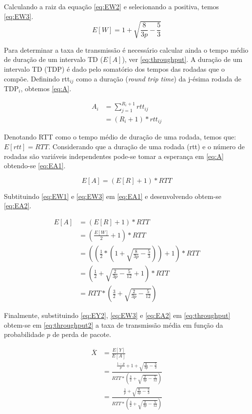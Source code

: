 Calculando a raiz da equação \eqref{eq:EW2} e selecionando a positiva, temos \eqref{eq:EW3}.
\begin{equation} \label{eq:EW3}
E[W] = 1 + \sqrt{\frac{8}{3p} - \frac{5}{3}}
\end{equation}

Para determinar a taxa de transmissão é necessário calcular ainda o tempo médio de duração de um intervalo 
TD ($E[A]$), ver \eqref{eq:throughput}. A duração de um intervalo TD (TDP) é dado pelo somatório dos tempos
das rodadas que o compõe. Definindo rtt$_{ij}$ como a duração (\textit{round trip time}) da j-ésima rodada
de TDP$_i$, obtemos \eqref{eq:A}.

\begin{align} \label{eq:A}
\nonumber A_i &= \sum_{j=1}^{R_i + 1} rtt_{ij} \\
&=(R_i + 1) * rtt_{ij}
\end{align}

Denotando RTT como o tempo médio de duração de uma rodada, temos que: $E[rtt]=RTT$. Considerando que a duração
de uma rodada (rtt) e o número de rodadas são variáveis independentes pode-se tomar a esperança em \eqref{eq:A}
obtendo-se \eqref{eq:EA1}.

\begin{equation} \label{eq:EA1}
E[A] = (E[R] + 1) * RTT
\end{equation}

Subtituindo \eqref{eq:EW1} e \eqref{eq:EW3} em \eqref{eq:EA1} e desenvolvendo obtem-se \eqref{eq:EA2}.

\begin{align} \label{eq:EA2}
\nonumber E[A] &= (E[R] + 1) * RTT \\
\nonumber &= \left(\frac{E[W]}{2} + 1\right) * RTT \\
\nonumber &= \left(\left(\frac{1}{2} * \left(1 + \sqrt{\frac{8}{3p} - \frac{5}{3}}\right)\right) + 1\right) * RTT \\
\nonumber &= \left(\frac{1}{2} + \sqrt{\frac{2}{3p} - \frac{5}{12}} + 1\right) * RTT \\
&= RTT * \left(\frac{3}{2} + \sqrt{\frac{2}{3p} - \frac{5}{12}} \right)
\end{align}

Finalmente, substituindo \eqref{eq:EY2}, \eqref{eq:EW3} e \eqref{eq:EA2} em \eqref{eq:throughput} obtem-se em
\eqref{eq:throughput2} a taxa de transmissão média em função da probabilidade $p$ de perda de pacote.

\begin{align} \label{eq:throughput2}
\nonumber \overline{X} &= \frac{E[Y]}{E[A]} \\
\nonumber &=\frac{\frac{1 - p}{p} + 1 + \sqrt{\frac{8}{3p} - \frac{5}{3}}}{RTT * \left(\frac{3}{2} + \sqrt{\frac{2}{3p} - \frac{5}{12}} \right)} \\
&=\frac{\frac{1}{p} + \sqrt{\frac{8}{3p} - \frac{5}{3}}}{RTT * \left(\frac{3}{2} + \sqrt{\frac{2}{3p} - \frac{5}{12}} \right)}
\end{align}
